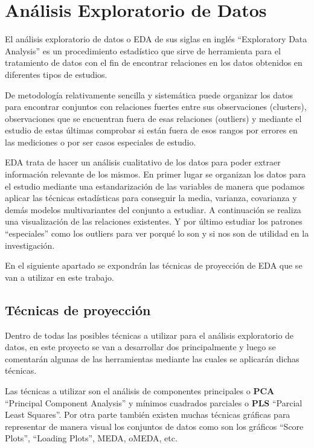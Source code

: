 \chapter{Análisis Exploratorio de Datos} \cite{LSBM} \cite{PHPDAT}

El análisis exploratorio de datos o EDA de sus siglas en inglés “Exploratory Data Analysis” es un procedimiento estadístico que sirve de herramienta para el tratamiento de datos con el fin de encontrar relaciones en los datos obtenidos en diferentes tipos de estudios. 

\bigskip

De metodología relativamente sencilla y sistemática puede organizar los datos para encontrar conjuntos con relaciones fuertes entre sus observaciones (clusters), observaciones que se encuentran fuera de esas relaciones (outliers) y mediante el estudio de estas últimas comprobar si están fuera de esos rangos por errores en las mediciones o por ser casos especiales de estudio.

\bigskip

EDA trata de hacer un análisis cualitativo de los datos para poder extraer información relevante de los mismos. En primer lugar se organizan los datos para el estudio mediante una estandarización de las variables de manera que podamos aplicar las técnicas estadísticas para conseguir la media, varianza, covarianza y demás modelos multivariantes del conjunto a estudiar. A continuación se realiza una visualización de las relaciones existentes. Y por último estudiar los patrones “especiales” como los outliers para ver porqué lo son y si nos son de utilidad en la investigación.

\bigskip

En el siguiente apartado se expondrán las técnicas de proyección de EDA que se van a utilizar en este trabajo.

\bigskip

\section{Técnicas de proyección}
Dentro de todas las posibles técnicas a utilizar para el análisis exploratorio de datos, en este proyecto se van a desarrollar dos principalmente y luego se comentarán algunas de las herramientas mediante las cuales se aplicarán dichas técnicas.
\bigskip 

Las técnicas a utilizar son el análisis de componentes principales o \textbf{PCA} “Principal Component Analysis” y mínimos cuadrados parciales o \textbf{PLS} “Parcial Least Squares”. Por otra parte también existen muchas técnicas gráficas para representar de manera visual los conjuntos de datos como son los gráficos “Score Plots”, “Loading Plots”, MEDA, oMEDA, etc.
\bigskip


